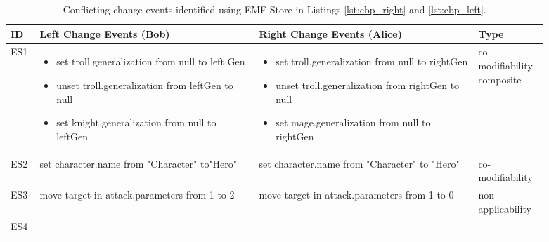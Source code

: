 \begin{table}[ht]
  \centering
  \caption{Conflicting change events identified using EMF Store in Listings \ref{lst:cbp_right} and \ref{lst:cbp_left}.}
  \label{table:conflicts_emfs}
    \begin{tabular}{|p{0.04\linewidth}|p{0.37\linewidth}|p{0.37\linewidth}|
        p{0.11\linewidth}|}
      \hline
      \textbf{ID} & 
      \textbf{Left Change Events (Bob)} & 
      \textbf{Right Change Events (Alice)} & 
      \textbf{Type}\\ 
      \hline
      ES1 & 
      \begin{minipage}[t]{\linewidth}
        \raggedright
        \begin{itemize}[leftmargin=0pt]
          \setlength
          \item[] set troll.generalization from null to left
          Gen
          \item[] unset troll.generalization from leftGen
          to null
          \item[] set knight.generalization from null
          to leftGen
        \end{itemize}
      \end{minipage} & 
      \begin{minipage}[t]{\linewidth}
        \raggedright
        \begin{itemize}[leftmargin=0pt]
          \setlength
          \item[] set troll.generalization from null to
          rightGen
          \item[] unset troll.generalization from rightGen
          to null
          \item[] set mage.generalization from null to
          rightGen
        \end{itemize}
      \end{minipage} & 
      co-modifiability
      composite \\
      \hline
      ES2 & set character.name from "Character"
      to"Hero" & 
      set character.name from "Character"
      to "Hero" & 
      co-modifiability \\ 
      \hline
      ES3 & 
      move target in attack.parameters from
      1 to 2
      & 
      move target in attack.parameters from
      1 to 0
      & 
      non-applicability\\
      \hline
      ES4 & 
      \begin{minipage}[t]{\linewidth}
        \raggedright
        \begin{itemize}[leftmargin=0pt]

\end{itemize}
\end{minipage}
\end{tabular}
\end{table}
